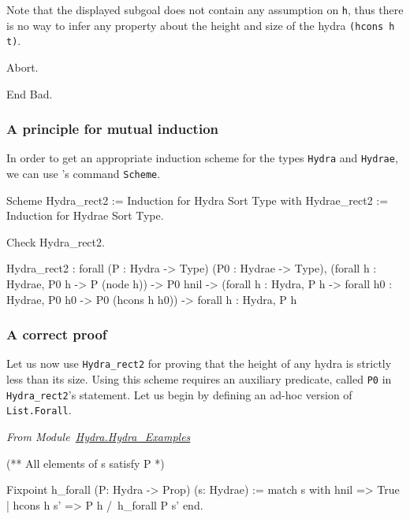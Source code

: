 \documentclass[a4paper]{book}
\begin{document}
Note that the displayed subgoal does not contain any assumption on \texttt{h}, thus there is no way to 
infer any property about the height and size of the hydra \texttt{(hcons h t)}.

\begin{Coqbad}
Abort.

End Bad.
\end{Coqbad}

\subsubsection{A principle for  mutual induction}
In order to get an appropriate induction scheme for the types 
\texttt{Hydra} and \texttt{Hydrae}, we can use  \coq{}'s  command \texttt{Scheme}.



\begin{Coqsrc}
Scheme Hydra_rect2 := Induction for Hydra Sort Type
with Hydrae_rect2 := Induction for Hydrae Sort Type.
\end{Coqsrc}  


\begin{Coqsrc}
Check Hydra_rect2.
\end{Coqsrc}


\begin{Coqanswer}
Hydra_rect2
 : forall (P : Hydra -> Type) (P0 : Hydrae -> Type),
   (forall h : Hydrae, P0 h -> P (node h)) ->
    P0 hnil ->
    (forall h : Hydra, P h -> 
             forall h0 : Hydrae, P0 h0 -> P0 (hcons h h0)) ->
    forall h : Hydra, P h
\end{Coqanswer}  




\subsubsection{A correct proof}

Let us now use \texttt{Hydra\_rect2} for proving that the height of any hydra is strictly less than its size.
Using this scheme requires an auxiliary predicate, called \texttt{P0} in \texttt{Hydra\_rect2}'s statement. 
Let us begin by defining an ad-hoc version of \texttt{List.Forall}.

\vspace{4pt}
\emph{From Module~\href{../src/html/hydras.Hydra.Hydra_Examples.html}{Hydra.Hydra\_Examples}}

\begin{Coqsrc}
(** All elements of s satisfy P *)

Fixpoint h_forall (P: Hydra -> Prop) (s: Hydrae) :=
  match s with
      hnil => True
    | hcons h s' => P h /\ h_forall P s'
  end.
 \end{Coqsrc}
\end{document}
